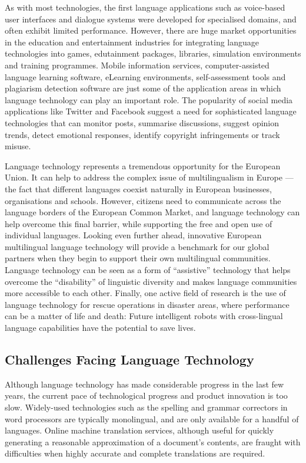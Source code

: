 \documentclass[]{../metanetpaper}
\begin{document}
\begin{multicols}{2}
As with most technologies, the first language applications such as voice-based user interfaces and dialogue systems were developed for specialised domains, and often exhibit limited performance. However, there are huge market opportunities in the education and entertainment industries for integrating language technologies into games, edutainment packages, libraries, simulation environments and training programmes. Mobile information services, computer-assisted language learning software, eLearning environments, self-assessment tools and plagiarism detection software are just some of the application areas in which language technology can play an important role. The popularity of social media applications like Twitter and Facebook suggest a need for sophisticated language technologies that can monitor posts, summarise discussions, suggest opinion trends, detect emotional responses, identify copyright infringements or track misuse.


Language technology represents a tremendous opportunity for the European Union. It can help to address the complex issue of multilingualism in Europe --- the fact that different languages coexist naturally in European businesses, organisations and schools. However, citizens need to communicate across the language borders of the European Common Market, and language technology can help overcome this final barrier, while supporting the free and open use of individual languages. Looking even further ahead, innovative European multilingual language technology will provide a benchmark for our global partners when they begin to support their own multilingual communities. Language technology can be seen as a form of ``assistive'' technology that helps overcome the ``disability'' of linguistic diversity and makes language communities more accessible to each other. Finally, one active field of research is the use of language technology for rescue operations in disaster areas, where performance can be a matter of life and death: Future intelligent robots with cross-lingual language capabilities have the potential to save lives.

\subsection{Challenges Facing Language Technology}

Although language technology has made considerable progress in the
last few years, the current pace of technological progress and product
innovation is too slow. Widely-used technologies such as the spelling
and grammar correctors in word processors are typically monolingual,
and are only available for a handful of languages. 
Online machine
translation services, although useful for quickly generating a
reasonable approximation of a document’s contents, are fraught with
difficulties when highly accurate and complete translations are
required. 


\end{multicols}
\end{document}
